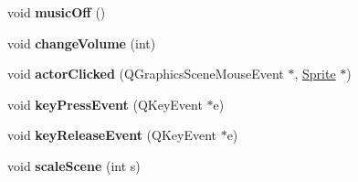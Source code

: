 \begin{DoxyCompactItemize}
\mbox{\label{class_main_window_a00caa93f8f96a6b5b1d6c991afc090b6}} 
void {\bfseries music\+Off} ()
\item 
\mbox{\label{class_main_window_a7eada83031022060e247636a27d4b6fc}} 
void {\bfseries change\+Volume} (int)
\item 
\mbox{\label{class_main_window_a09fe9270f0534ecf9e7acea4d1eaf8c4}} 
void {\bfseries actor\+Clicked} (Q\+Graphics\+Scene\+Mouse\+Event $\ast$, \hyperlink{class_sprite}{Sprite} $\ast$)
\item 
\mbox{\label{class_main_window_adf88315e557e377353059bd313b1bfa6}} 
void {\bfseries key\+Press\+Event} (Q\+Key\+Event $\ast$e)
\item 
\mbox{\label{class_main_window_a04b0c8ff3be04d1b1bf54e78c5ee7039}} 
void {\bfseries key\+Release\+Event} (Q\+Key\+Event $\ast$e)
\item 
\mbox{\label{class_main_window_afded6dc0db0f820485fda0ea61675e7c}} 
void {\bfseries scale\+Scene} (int s)
\end{DoxyCompactItemize}
